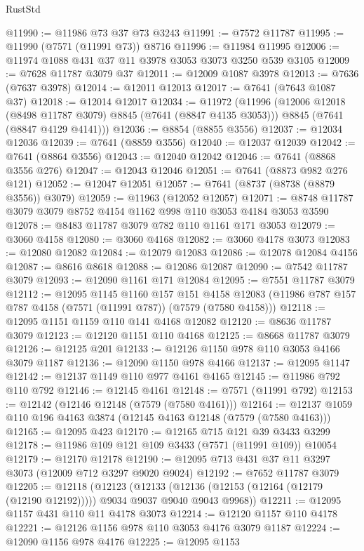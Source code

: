 \begin{lexlean}{RustStd}
\begin{coremodule}
@11990 := @11986 @73 @37 @73 @3243
@11991 := @7572 @11787
@11995 := @11990 (@7571 (@11991 @73)) @8716
@11996 := @11984 @11995
@12006 := @11974 @1088 @431 @37 @11 @3978 @3053 @3073 @3250 @539 @3105
@12009 := @7628 @11787 @3079 @37
@12011 := @12009 @1087 @3978
@12013 := @7636 (@7637 @3978)
@12014 := @12011 @12013
@12017 := @7641 (@7643 @1087 @37)
@12018 := @12014 @12017
@12034 := @11972
    (@11996
      (@12006 @12018 (@8498 @11787 @3079) @8845 (@7641 (@8847 @4135 @3053)))
      @8845
      (@7641 (@8847 @4129 @4141)))
@12036 := @8854 (@8855 @3556)
@12037 := @12034 @12036
@12039 := @7641 (@8859 @3556)
@12040 := @12037 @12039
@12042 := @7641 (@8864 @3556)
@12043 := @12040 @12042
@12046 := @7641 (@8868 @3556 @276)
@12047 := @12043 @12046
@12051 := @7641 (@8873 @982 @276 @121)
@12052 := @12047 @12051
@12057 := @7641 (@8737 (@8738 (@8879 @3556)) @3079)
@12059 := @11963 (@12052 @12057)
@12071 := @8748 @11787 @3079 @3079 @8752 @4154 @1162 @998 @110 @3053 @4184 @3053 @3590
@12078 := @8483 @11787 @3079 @782 @110 @1161 @171 @3053
@12079 := @3060 @4158
@12080 := @3060 @4168
@12082 := @3060 @4178 @3073
@12083 := @12080 @12082
@12084 := @12079 @12083
@12086 := @12078 @12084 @4156
@12087 := @8616 @8618
@12088 := @12086 @12087
@12090 := @7542 @11787 @3079
@12093 := @12090 @1161 @171 @12084
@12095 := @7551 @11787 @3079
@12112 := @12095
    @1145
    @1160
    @157
    @151
    @4158
    @12083
    (@11986 @787 @157 @787 @4158 (@7571 (@11991 @787)) (@7579 (@7580 @4158)))
@12118 := @12095 @1151 @1159 @110 @141 @4168 @12082
@12120 := @8636 @11787 @3079
@12123 := @12120 @1151 @110 @4168
@12125 := @8668 @11787 @3079
@12126 := @12125 @201
@12133 := @12126 @1150 @978 @110 @3053 @4166 @3079 @1187
@12136 := @12090 @1150 @978 @4166
@12137 := @12095 @1147
@12142 := @12137 @1149 @110 @977 @4161 @4165
@12145 := @11986 @792 @110 @792
@12146 := @12145 @4161
@12148 := @7571 (@11991 @792)
@12153 := @12142 (@12146 @12148 (@7579 (@7580 @4161)))
@12164 := @12137 @1059 @110 @196 @4163 @3874 (@12145 @4163 @12148 (@7579 (@7580 @4163)))
@12165 := @12095 @423
@12170 := @12165 @715 @121 @39 @3433 @3299
@12178 := @11986 @109 @121 @109 @3433 (@7571 (@11991 @109)) @10054
@12179 := @12170 @12178
@12190 := @12095 @713 @431 @37 @11 @3297 @3073 (@12009 @712 @3297 @9020 @9024)
@12192 := @7652 @11787 @3079
@12205 := @12118
    (@12123
      (@12133 (@12136 (@12153 (@12164 (@12179 (@12190 @12192))))) @9034 @9037 @9040 @9043 @9968))
@12211 := @12095 @1157 @431 @110 @11 @4178 @3073
@12214 := @12120 @1157 @110 @4178
@12221 := @12126 @1156 @978 @110 @3053 @4176 @3079 @1187
@12224 := @12090 @1156 @978 @4176
@12225 := @12095 @1153

\end{coremodule}
\end{lexlean}
